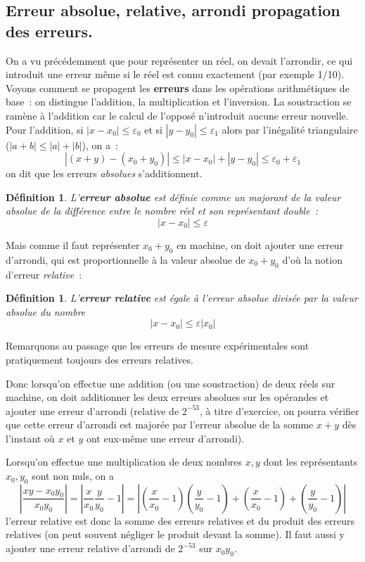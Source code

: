 \documentclass[a4paper,11pt]{book}
\newtheorem{defn}[thm]{D\'efinition}
\begin{document}
\begin{giacjshere}
\subsection{Erreur absolue, relative, arrondi propagation des erreurs.}
On a vu pr\'ec\'edemment que pour repr\'esenter un r\'eel, on devait
l'arrondir, ce qui introduit une erreur m\^eme si le r\'eel est
connu exactement (par exemple 1/10).
Voyons comment se propagent les {\bf erreurs} 
dans les opérations arithmétiques
de base~: on distingue l'addition, la multiplication
et l'inversion. La soustraction se ramène à l'addition car
le calcul de l'opposé n'introduit aucune erreur nouvelle.
Pour l'addition, si $|x -x_0| \leq \varepsilon_0$ et si $|y-y_0| \leq \varepsilon_1$
alors par l'inégalité triangulaire ($|a+b|\leq |a|+|b|$), on a~:
\[ |(x+y)-(x_0+y_0)| \leq |x-x_0| + | y-y_0 | \leq 
\varepsilon_0 + \varepsilon_1 \]
on dit que les erreurs {\em absolues\/} s'additionnent. 
\begin{defn}
L'{\bf erreur absolue}
est définie comme un majorant de la valeur absolue
de la différence entre le nombre réel et
son représentant double~:
\[ |x-x_0| \leq \varepsilon \]
\end{defn}
Mais comme il faut représenter $x_0+y_0$
en machine, on doit ajouter une erreur d'arrondi, qui est
proportionnelle \`a la valeur absolue de $x_0+y_0$ d'o\`u la notion
d'erreur {\em relative}~:
\begin{defn}
L'{\bf erreur relative} 
est égale à l'erreur absolue divisée par
la valeur absolue du nombre
\[ |x-x_0| \leq \varepsilon |x_0| \]
\end{defn}
Remarquons au passage que les erreurs de mesure expérimentales sont 
pratiquement toujours des erreurs relatives.

Donc lorsqu'on effectue une addition (ou une soustraction) de deux réels
sur machine, on doit additionner les deux erreurs absolues sur les opérandes
et ajouter une erreur d'arrondi (relative de $2^{-53}$, à titre
d'exercice, on pourra vérifier que cette erreur
d'arrondi est majorée par l'erreur absolue de la somme 
$x+y$ dès l'instant où
$x$ et $y$ ont eux-même une erreur d'arrondi).

Lorsqu'on effectue une multiplication de deux nombres $x,y$ dont les
représentants $x_0,y_0$ sont non nuls, on a
\[ \left| \frac{xy-x_0 y_0}{x_0 y_0} \right| = 
\left| \frac{x}{x_0} \frac{y}{y_0} -1 \right|
= \left| 
(\frac{x}{x_0}-1)(\frac{y}{y_0} -1)+(\frac{x}{x_0}-1)+(\frac{y}{y_0} -1) 
\right|  \]
l'erreur relative est donc la somme des erreurs relatives et du produit
des erreurs relatives (on peut souvent négliger le produit devant la somme). Il
faut aussi y ajouter une erreur relative d'arrondi de $2^{-53}$ sur $x_0 y_0$.


\end{giacjshere}
\end{document}
